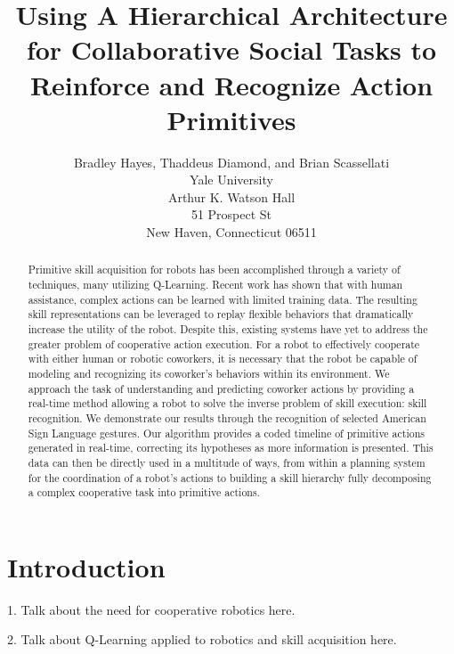 \documentclass[letterpaper]{article}
\begin{document}
\title{Using A Hierarchical Architecture for Collaborative Social Tasks to Reinforce and Recognize Action Primitives}
\author{Bradley Hayes, Thaddeus Diamond, and Brian Scassellati\\
Yale University\\
Arthur K. Watson Hall\\
51 Prospect St\\
New Haven, Connecticut 06511\\
}

\maketitle

\begin{abstract}
Primitive skill acquisition for robots has been accomplished through a variety
of techniques, many utilizing Q-Learning. Recent work has shown that with human
assistance, complex actions can be learned with limited training data. The
resulting skill representations can be leveraged to replay flexible behaviors
that dramatically increase the utility of the robot. Despite this, existing
systems have yet to address the greater problem of cooperative action execution.
For a robot to effectively cooperate with either human or robotic coworkers,
it is necessary that the robot be capable of modeling and recognizing its
coworker’s behaviors within its environment. We approach the task of
understanding and predicting coworker actions by providing a real-time method
allowing a robot to solve the inverse problem of skill execution: skill
recognition. We demonstrate our results through the recognition of selected
American Sign Language gestures. Our algorithm provides a coded timeline of
primitive actions generated in real-time, correcting its hypotheses as more
information is presented. This data can then be directly used in a multitude
of ways, from within a planning system for the coordination of a robot's
actions to building a skill hierarchy fully decomposing a complex cooperative 
task into primitive actions.
\end{abstract}

\section{Introduction}
\label{sec:intro}
1. Talk about the need for cooperative robotics here.

2. Talk about Q-Learning applied to robotics and skill acquisition here.
\end{document}

